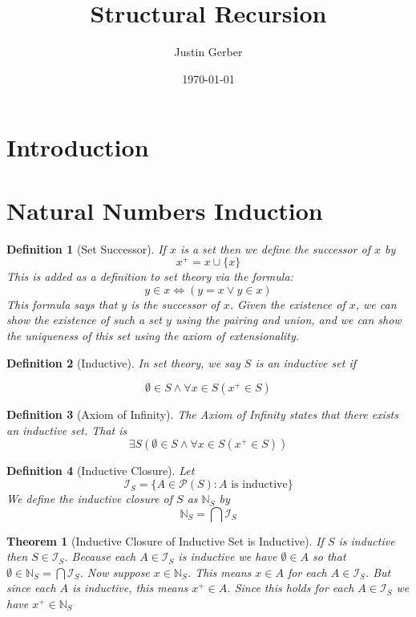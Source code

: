 \documentclass[12pt]{article}
\theoremstyle{break}
\newtheorem{definition}{Definition}[section]
\theoremstyle{break}
\newtheorem{theorem}{Theorem}[section]
\theoremstyle{break}
\theoremstyle{break}
\theoremstyle{break}
\newtheorem{informal definition}[definition]{Informal Definition}
\begin{document}
\title{Structural Recursion}
\author{Justin Gerber}
\date{\today}
\maketitle

\section{Introduction}

\section{Natural Numbers Induction}

\begin{definition}[Set Successor]
If $x$ is a set then we define the successor of $x$ by
$$
x^+ = x \cup \{x\}
$$
This is added as a definition to set theory via the formula:
$$
y \in x \iff (y=x \lor y\in x)
$$
This formula says that $y$ is the successor of $x$.
Given the existence of $x$, we can show the existence of such a set $y$ using the pairing and union, and we can show the uniqueness of this set using the axiom of extensionality.
\end{definition}

\begin{definition}[Inductive]
In set theory, we say $S$ is an inductive set if

$$
\emptyset \in S \land \forall x\in S(x^+ \in S)
$$
\end{definition}

\begin{definition}[Axiom of Infinity]
The Axiom of Infinity states that there exists an inductive set.
That is
$$
\exists S (\emptyset \in S \land \forall x\in S(x^+ \in S))
$$
\end{definition}

\begin{definition}[Inductive Closure]
Let
$$
\mathcal{I}_S = \{A \in \mathcal{P}(S): A\text{ is inductive}\}
$$
We define the inductive closure of $S$ as $\mathbb{N}_S$ by
$$
\mathbb{N}_S = \bigcap \mathcal{I}_S
$$
\end{definition}

\begin{theorem}[Inductive Closure of Inductive Set is Inductive]
If $S$ is inductive then $S\in\mathcal{I}_S$.
Because each $A \in \mathcal{I}_S$ is inductive we have $\emptyset \in A$ so that $\emptyset \in \mathbb{N}_S = \bigcap\mathcal{I}_S$.
Now suppose $x\in \mathbb{N}_S$.
This means $x\in A$ for each $A\in \mathcal{I}_S$.
But since each $A$ is inductive, this means $x^+ \in A$.
Since this holds for each $A \in \mathcal{I}_S$ we have $x^+ \in \mathbb{N}_S$
\end{theorem}
\end{document}
